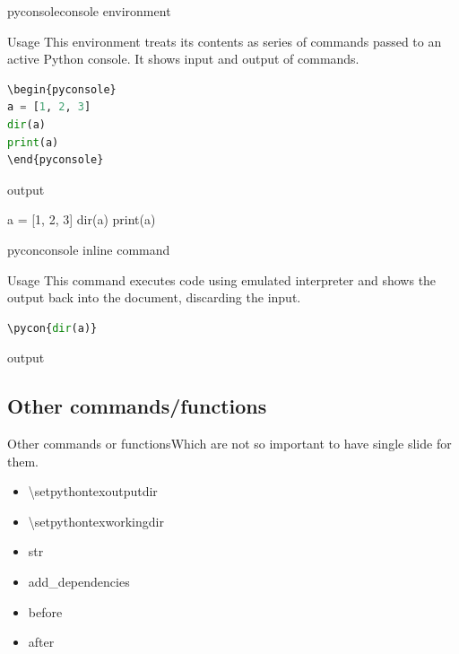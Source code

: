 \documentclass[
aspectratio=1610,
hyperref={pdfpagemode=FullScreen},
english,
usenames,
dvipsnames
]
{beamer} %
\begin{document}
   \begin{frame}[fragile]{pyconsole}{console environment}
  
  \begin{block}{Usage}
  	This environment treats its contents as series of commands passed to an active Python console. It shows input and output of commands.
  \end{block}
  
 \begin{lstlisting}[basicstyle=\tiny, language=python]
\begin{pyconsole}
a = [1, 2, 3] 
dir(a) 
print(a)
\end{pyconsole}
\end{lstlisting}
  
\begin{exampleblock}{output}
\begin{pyconsole}
a = [1, 2, 3]
dir(a)
print(a)
\end{pyconsole}
    \onslide
	\end{exampleblock}
  
  \end{frame}
  
  \begin{frame}[fragile]{pycon}{console inline command}
  
  \begin{block}{Usage}
  	This command executes code using emulated interpreter and shows the output back into the document, discarding the input.
  \end{block}
  
 \begin{lstlisting}[basicstyle=\tiny, language=python]
\pycon{dir(a)}
\end{lstlisting}
  
\begin{exampleblock}{output}
    \onslide
	\end{exampleblock}
  
  \end{frame}

\subsection{Other commands/functions}
\begin{frame}[fragile]{Other commands or functions}{Which are not so important to have single slide for them.}

\begin{itemize}[<+->]
\item \textbackslash{}setpythontexoutputdir
\item \textbackslash{}setpythontexworkingdir
\item str
\item add\_dependencies
\item before
\item after
\end{itemize}
\onslide
\end{frame}
\end{document}
